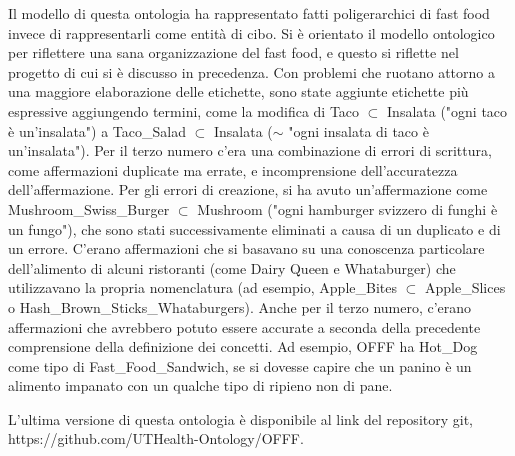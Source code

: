 Il modello di questa ontologia ha rappresentato fatti poligerarchici di fast food invece di rappresentarli come entità di cibo. Si è orientato il modello ontologico per riflettere una sana organizzazione del fast food, e questo si riflette nel progetto di cui si è discusso in precedenza. 
Con problemi che ruotano attorno a una maggiore elaborazione delle etichette, sono state aggiunte etichette più espressive aggiungendo termini, come la modifica di Taco $\subset$ Insalata ("ogni taco è un'insalata") a Taco\_Salad $\subset$ Insalata ($\sim$ "ogni insalata di taco è un'insalata"). 
Per il terzo numero c'era una combinazione di errori di scrittura, come affermazioni duplicate ma errate, e incomprensione dell'accuratezza dell'affermazione. 
Per gli errori di creazione, si ha avuto un'affermazione come Mushroom\_Swiss\_Burger $\subset$ Mushroom ("ogni hamburger svizzero di funghi è un fungo"), che sono stati successivamente eliminati a causa di un duplicato e di un errore. 
C'erano affermazioni che si basavano su una conoscenza particolare dell'alimento di alcuni ristoranti (come Dairy Queen e Whataburger) che utilizzavano la propria nomenclatura (ad esempio, Apple\_Bites $\subset$ Apple\_Slices o Hash\_Brown\_Sticks\_Whataburgers). 
Anche per il terzo numero, c'erano affermazioni che avrebbero potuto essere accurate a seconda della precedente comprensione della definizione dei concetti. 
Ad esempio, OFFF ha Hot\_Dog come tipo di Fast\_Food\_Sandwich, se si dovesse capire che un panino è un alimento impanato con un qualche tipo di ripieno non di pane. 

L'ultima versione di questa ontologia è disponibile al link del repository git, https://github.com/UTHealth-Ontology/OFFF.